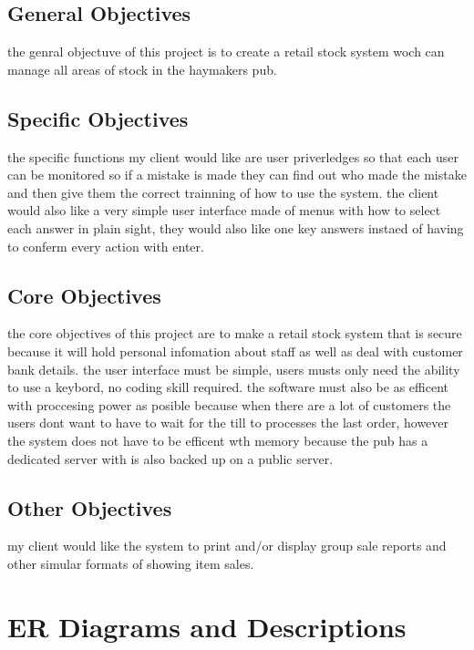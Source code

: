 \subsection{General Objectives}

the genral objectuve of this project is to create a retail stock system woch can manage all areas of stock in the haymakers pub.

\subsection{Specific Objectives}

the specific functions my client would like are user priverledges so that each user can be monitored so if a mistake is made they can find out who made the mistake and then give them the correct trainning of how to use the system. the client would also like a very simple user interface made of menus with how to select each answer in plain sight, they would also like one key answers instaed of having to conferm every action with enter.

\subsection{Core Objectives}

the core objectives of this project are to make a retail stock system that is secure because it will hold personal infomation about staff as well as deal with customer bank details. the user interface must be simple, users musts only need the ability to use a keybord, no coding skill required. the software must also be as efficent with proccesing power as posible because when there are a lot of customers the users dont want to have to wait for the till to processes the last order, however the system does not have to be efficent wth memory because the pub has a dedicated server with is also backed up on a public server.

\subsection{Other Objectives}

my client would like the system to print and/or display group sale reports and other simular formats of showing item sales.

\section{ER Diagrams and Descriptions}


